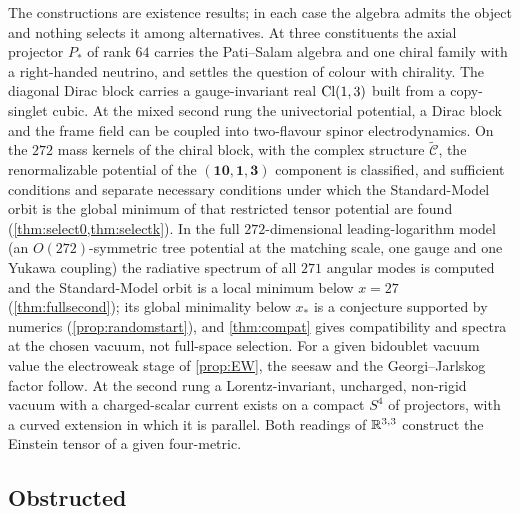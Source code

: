 The constructions are existence results; in each case the algebra admits the object and nothing selects it among alternatives. At three constituents the axial projector
$P_*$ of rank $64$ carries the Pati--Salam algebra and one chiral family with a right-handed neutrino, and settles the question of colour with chirality. The diagonal Dirac
block carries a gauge-invariant real $\mathrm{Cl}(1,3)$ built from a copy-singlet cubic. At the mixed second rung the univectorial potential, a Dirac block and the frame field can
be coupled into two-flavour spinor electrodynamics. On the $272$ mass kernels of the chiral block, with the complex structure $\widetilde{\mathcal C}$, the renormalizable potential of the $(\mathbf{10},\mathbf1,\mathbf3)$
component is classified, and sufficient conditions and separate necessary conditions under which the Standard-Model orbit is the global
minimum of that restricted tensor potential are found (\cref{thm:select0,thm:selectk}). In the full $272$-dimensional leading-logarithm model
(an $O(272)$-symmetric tree potential at the matching scale, one gauge and one Yukawa coupling) the radiative spectrum of all $271$ angular modes is
computed and the Standard-Model orbit is a local minimum below $x=27$ (\cref{thm:fullsecond}); its global minimality below $x_*$ is a conjecture supported
by numerics (\cref{prop:randomstart}), and \cref{thm:compat} gives compatibility and spectra at the chosen vacuum, not full-space selection. For a given bidoublet vacuum value the electroweak
stage of \cref{prop:EW}, the seesaw and the Georgi--Jarlskog factor follow. At the second rung a Lorentz-invariant, uncharged, non-rigid
vacuum with a charged-scalar current exists on a compact $S^4$ of projectors, with a curved extension in which it is parallel. Both readings of $\mathbb{R}^{3,3}$ construct the
Einstein tensor of a given four-metric.

\subsection{Obstructed}


